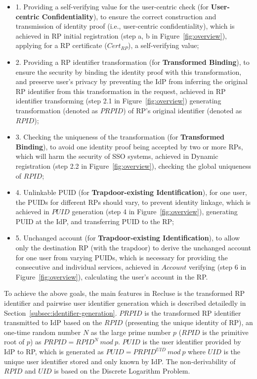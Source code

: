 \begin{itemize}
  \item 1. Providing a self-verifying value for the user-centric check (for \textbf{User-centric Confidentiality}), to ensure the correct construction and transmission of identity proof (i.e., user-centric confidentiality), which is achieved in RP initial registration (step a, b in Figure~\ref{fig:overview}), applying for a RP certificate ($Cert_{RP}$), a self-verifying value;
  \item 2. Providing a RP identifier transformation (for \textbf{Transformed Binding}), to ensure the security by binding the identity proof with this transformation, and preserve user's privacy by preventing the IdP from inferring the original RP identifier from this transformation in the request, achieved in RP identifier transforming (step 2.1 in Figure~\ref{fig:overview}) generating transformation (denoted as $PRPID$) of RP's original identifier (denoted as $RPID$);
  \item 3. Checking the uniqueness of the transformation (for \textbf{Transformed Binding}), to avoid one identity proof being accepted by two or more RPs, which will harm the security of SSO systems, achieved in Dynamic registration (step 2.2 in Figure~\ref{fig:overview}), checking the global uniqueness of $RPID$;
  \item 4. Unlinkable PUID (for \textbf{Trapdoor-existing Identification}), for one user, the PUIDs for different RPs should vary, to prevent identity linkage, which is achieved in $PUID$ generation (step 4 in Figure~\ref{fig:overview}), generating PUID at the IdP, and transferring PUID to the RP;
  \item 5. Unchanged account (for \textbf{Trapdoor-existing Identification}), to allow only the destination RP (with the trapdoor) to derive the unchanged account for one user from varying PUIDs, which is necessary for providing the consecutive and individual services, achieved in $Account$ verifying (step 6 in Figure~\ref{fig:overview}), calculating the user's account in the RP.
\end{itemize}

To achieve the above goals, the main features in Recluse is the transformed RP identifier and pairwise user identifier generation which is described detailedly in Section~\ref{subsec:identifier-generation}. $PRPID$ is the transformed RP identifier transmitted to IdP based on the $RPID$ (presenting the unique identity of RP), an one-time random number $N$ as the large prime number $p$ ($RPID$ is the primitive root of $p$) as $PRPID = {RPID}^{N} \ mod \ p$. $PUID$ is the user identifier provided by IdP to RP, which is generated as $PUID = {PRPID}^{UID} \ mod \ p$ where $UID$ is the unique user identifier stored and only known by IdP. The non-derivability of $RPID$ and $UID$ is based on the Discrete Logarithm Problem.

